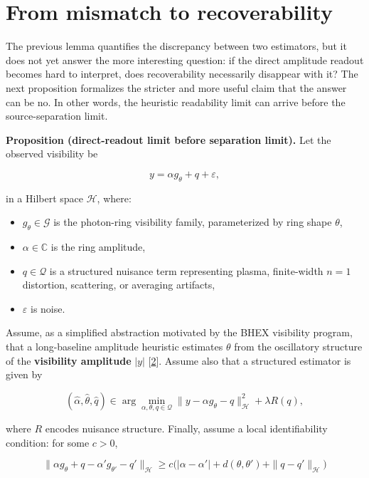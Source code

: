 \documentclass[10pt,letterpaper,twocolumn]{article}
\providecommand{\tightlist}{%
  \setlength{\itemsep}{0pt}\setlength{\parskip}{0pt}}
\begin{document}
\hypertarget{from-mismatch-to-recoverability}{%
\section{From mismatch to
recoverability}\label{from-mismatch-to-recoverability}}

The previous lemma quantifies the discrepancy between two estimators,
but it does not yet answer the more interesting question: if the direct
amplitude readout becomes hard to interpret, does recoverability
necessarily disappear with it? The next proposition formalizes the
stricter and more useful claim that the answer can be no. In other
words, the heuristic readability limit can arrive before the
source-separation limit.

\par\smallskip\noindent{}\textbf{Proposition (direct-readout limit
before separation limit).} Let the observed visibility be

\[
y=\alpha g_\theta + q + \varepsilon,
\]

in a Hilbert space \(\mathcal H\), where:

\begin{itemize}
\tightlist
\item
  \(g_\theta \in \mathcal G\) is the photon-ring visibility family,
  parameterized by ring shape \(\theta\),
\item
  \(\alpha \in \mathbb C\) is the ring amplitude,
\item
  \(q \in \mathcal Q\) is a structured nuisance term representing
  plasma, finite-width \(n=1\) distortion, scattering, or averaging
  artifacts,
\item
  \(\varepsilon\) is noise.
\end{itemize}

Assume, as a simplified abstraction motivated by the BHEX visibility
program, that a long-baseline amplitude heuristic estimates \(\theta\) from
the oscillatory structure of the \textbf{visibility amplitude} \(|y|\)
[\hyperlink{ref-2}{2}]. Assume also that a structured estimator is given
by

\[
(\hat\alpha,\hat\theta,\hat q)
\in
\arg\min_{\alpha,\theta,q\in\mathcal Q}
\|y-\alpha g_\theta-q\|_{\mathcal H}^2+\lambda R(q),
\]

where \(R\) encodes nuisance structure. Finally, assume a local
identifiability condition: for some \(c>0\),

\[
\|\alpha g_\theta + q - \alpha' g_{\theta'} - q'\|_{\mathcal H}
\ge
c\Big(|\alpha-\alpha'| + d(\theta,\theta') + \|q-q'\|_{\mathcal H}\Big)
\]
\end{document}
